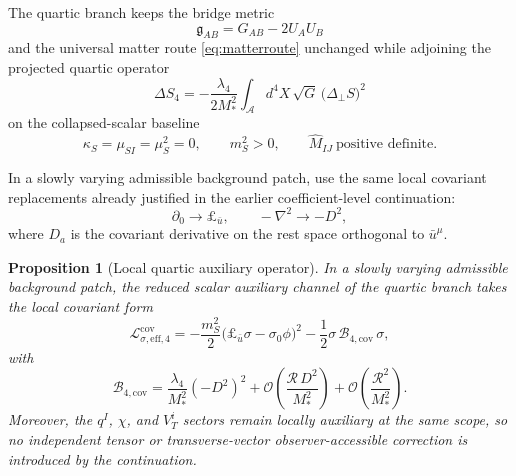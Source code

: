 \documentclass[11pt]{article}
\newcommand{\Sub}{\mathcal{A}}
\newcommand{\BridgeMetric}{\mathfrak{g}}
\newtheorem{proposition}{Proposition}
\begin{document}
The quartic branch keeps the bridge metric
\begin{equation}
\BridgeMetric_{AB}=G_{AB}-2U_AU_B
\label{eq:bridge}
\end{equation}
and the universal matter route \eqref{eq:matterroute} unchanged while adjoining the projected quartic operator
\begin{equation}
\Delta S_4
=
-\frac{\lambda_4}{2M_*^2}
\int_{\Sub} d^4X\,\sqrt{G}\,
\bigl(\Delta_\perp S\bigr)^2
\label{eq:S4}
\end{equation}
on the collapsed-scalar baseline
\begin{equation}
\kappa_S=\mu_{SI}=\mu_S^2=0,
\qquad
m_S^2>0,
\qquad
\widehat M_{IJ}\ \text{positive definite}.
\label{eq:baseline}
\end{equation}

In a slowly varying admissible background patch, use the same local covariant replacements already justified in the earlier coefficient-level continuation:
\begin{equation}
\partial_0 \to \pounds_{\bar u},
\qquad
-\nabla^2 \to -D^2,
\label{eq:covreplace}
\end{equation}
where \(D_a\) is the covariant derivative on the rest space orthogonal to \(\bar u^\mu\).

\begin{proposition}[Local quartic auxiliary operator]
In a slowly varying admissible background patch, the reduced scalar auxiliary channel of the quartic branch takes the local covariant form
\begin{equation}
\mathcal L_{\sigma,\mathrm{eff},4}^{\mathrm{cov}}
=
-\frac{m_S^2}{2}\bigl(\pounds_{\bar u}\sigma-\sigma_0\phi\bigr)^2
-\frac{1}{2}\sigma\,\mathcal B_{4,\mathrm{cov}}\,\sigma,
\label{eq:Lsigmacov}
\end{equation}
with
\begin{equation}
\mathcal B_{4,\mathrm{cov}}
=
\frac{\lambda_4}{M_*^2}(-D^2)^2
+ \mathcal O\!\left(\frac{\mathcal R\,D^2}{M_*^2}\right)
+ \mathcal O\!\left(\frac{\mathcal R^2}{M_*^2}\right).
\label{eq:B4cov}
\end{equation}
Moreover, the \(q^I\), \(\chi\), and \(V_T^i\) sectors remain locally auxiliary at the same scope, so no independent tensor or transverse-vector observer-accessible correction is introduced by the continuation.
\end{proposition}
\end{document}
